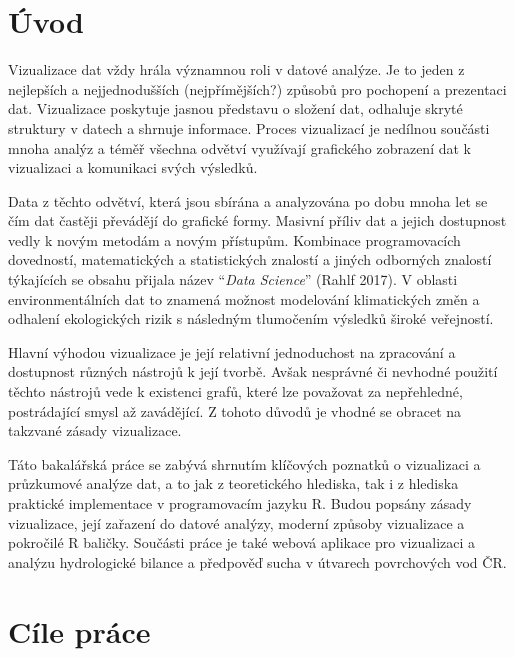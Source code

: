 \documentclass[12pt,]{article}
\title{}
\author{}
\date{}
\begin{document}


\tableofcontents

\newpage

\listoffigures
\listoftables

\newpage

\section{Úvod}\label{uvod}

\pagestyle{plain} \setcounter{page}{1}

\qquad Vizualizace dat vždy hrála významnou roli v datové analýze. Je to
jeden z nejlepších a nejjednodušších (nejpřímějších?) způsobů pro
pochopení a prezentaci dat. Vizualizace poskytuje jasnou představu o
složení dat, odhaluje skryté struktury v datech a shrnuje informace.
Proces vizualizací je nedílnou součásti mnoha analýz a téměř všechna
odvětví využívají grafického zobrazení dat k vizualizaci a komunikaci
svých výsledků.

\qquad Data z těchto odvětví, která jsou sbírána a analyzována po dobu
mnoha let se čím dat častěji převádějí do grafické formy. Masivní příliv
dat a jejich dostupnost vedly k novým metodám a novým přístupům.
Kombinace programovacích dovedností, matematických a statistických
znalostí a jiných odborných znalostí týkajících se obsahu přijala název
\enquote{\emph{Data Science}} (Rahlf 2017). V oblasti environmentálních
dat to znamená možnost modelování klimatických změn a odhalení
ekologických rizik s následným tlumočením výsledků široké veřejností.

\qquad Hlavní výhodou vizualizace je její relativní jednoduchost na
zpracování a dostupnost různých nástrojů k její tvorbě. Avšak nesprávné
či nevhodné použití těchto nástrojů vede k existenci grafů, které lze
považovat za nepřehledné, postrádající smysl až zavádějící. Z tohoto
důvodů je vhodné se obracet na takzvané zásady vizualizace.

\qquad Táto bakalářská práce se zabývá shrnutím klíčových poznatků o
vizualizaci a průzkumové analýze dat, a to jak z teoretického hlediska,
tak i z hlediska praktické implementace v programovacím jazyku R. Budou
popsány zásady vizualizace, její zařazení do datové analýzy, moderní
způsoby vizualizace a pokročilé R baličky. Součásti práce je také webová
aplikace pro vizualizaci a analýzu hydrologické bilance a předpověď
sucha v útvarech povrchových vod ČR.

\newpage

\section{Cíle práce}\label{cile-prace}
\end{document}

